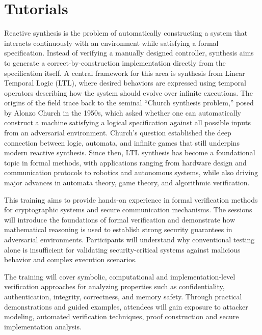 \documentclass[a4paper,UKenglish]{dagrep-v2021}
\begin{document}
\newpage

\section{Tutorials}


Reactive synthesis is the problem of automatically constructing a system that interacts continuously with an environment while satisfying a formal specification. Instead of verifying a manually designed controller, synthesis aims to generate a correct-by-construction implementation directly from the specification itself. A central framework for this area is synthesis from Linear Temporal Logic (LTL), where desired behaviors are expressed using temporal operators describing how the system should evolve over infinite executions. The origins of the field trace back to the seminal ``Church synthesis problem,'' posed by Alonzo Church in the 1950s, which asked whether one can automatically construct a machine satisfying a logical specification against all possible inputs from an adversarial environment. Church's question established the deep connection between logic, automata, and infinite games that still underpins modern reactive synthesis. Since then, LTL synthesis has become a foundational topic in formal methods, with applications ranging from hardware design and communication protocols to robotics and autonomous systems, while also driving major advances in automata theory, game theory, and algorithmic verification.


This training aims to provide hands-on experience in formal verification methods for cryptographic systems and secure communication mechanisms. The sessions will introduce the foundations of formal verification and demonstrate how mathematical reasoning is used to establish strong security guarantees in adversarial environments. Participants will understand why conventional testing alone is insufficient for validating security-critical systems against malicious behavior and complex execution scenarios.

The training will cover symbolic, computational and implementation-level verification approaches for analyzing properties such as confidentiality, authentication, integrity, correctness, and memory safety. Through practical demonstrations and guided examples, attendees will gain exposure to attacker modeling, automated verification techniques, proof construction and secure implementation analysis.
\end{document}
